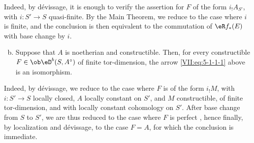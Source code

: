 Indeed, by dévissage, it is enough to verify the assertion for $F$ of the
form $i_! A_{S'}$, with $i:S'\to S$ quasi-finite. By the Main Theorem, we
reduce to the case where $i$ is finite, and the conclusion is then equivalent
to the commutation of $\eR f_\ast(E)$ with base change by $i$.
\begin{enumerate}[a)]
\setcounter{enumi}{1}
  \item Suppose that $A$ is noetherian and constructible. Then, for every
    constructible $F\in\ob\eD^b(S,A^\circ)$ of finite tor-dimension, the arrow
    \eqref{VII:eq:5-1-1-1} above is an isomorphism.
\end{enumerate}

Indeed, by dévissage, we reduce to the case where $F$ is of the form $i_! M$,
with $i:S'\to S$ locally closed, $A$ locally constant on $S'$, and $M$
constructible, of finite tor-dimension, and with locally constant cohomology
on $S'$. After base change from $S$ to $S'$, we are thus reduced to the case
where $F$ is perfect \cite[I]{sga6}, hence finally, by localization and
dévissage, to the case $F=A$, for which the conclusion is immediate.





\subsubsection{}\label{VII:5-1-3}

